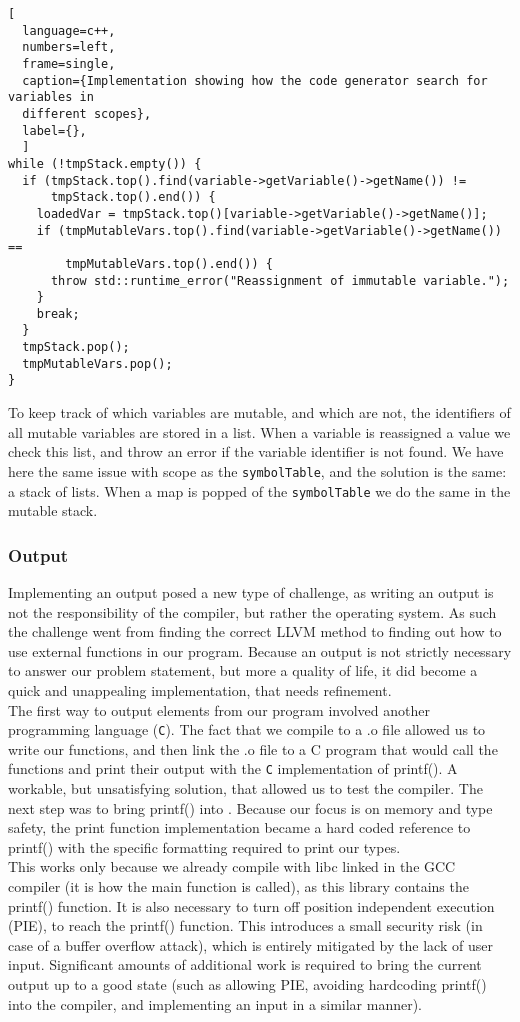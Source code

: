 \begin{lstlisting}[
  language=c++,
  numbers=left, 
  frame=single,
  caption={Implementation showing how the code generator search for variables in
  different scopes},
  label={},
  ]
while (!tmpStack.empty()) {
  if (tmpStack.top().find(variable->getVariable()->getName()) !=
      tmpStack.top().end()) {
    loadedVar = tmpStack.top()[variable->getVariable()->getName()];
    if (tmpMutableVars.top().find(variable->getVariable()->getName()) ==
        tmpMutableVars.top().end()) {
      throw std::runtime_error("Reassignment of immutable variable.");
    }
    break;
  }
  tmpStack.pop();
  tmpMutableVars.pop();
}
\end{lstlisting}

To keep track of which variables are mutable, and which are not, the identifiers of
all mutable variables are stored in a list. When a variable is reassigned a value we
check this list, and throw an error if the variable identifier is not found. We have
here the same issue with scope as the \texttt{symbolTable}, and the solution is the same: a
stack of lists. When a map is popped of the \texttt{symbolTable} we do the same in the
mutable stack.

\subsubsection{Output}
\label{sec:Output}
Implementing an output posed a new type of challenge, as writing an output is not the responsibility of the compiler, but rather the operating system. As such the challenge went from finding the correct LLVM method to finding out how to use external functions in our program. Because an output is not strictly necessary to answer our problem statement, but more a quality of life, it did become a quick and unappealing implementation, that needs refinement.\\

The first way to output elements from our  program involved another programming
language (\texttt{C}). The fact that we compile to a .o file allowed us to write our
functions, and then link the .o file to a C program that would call the \lang{}
functions and print their output with the \texttt{C} implementation of printf(). A workable, but unsatisfying solution, that allowed us to test the compiler. The next step was to bring printf() into \lang. Because our focus is on memory and type safety, the print function implementation became a hard coded reference to printf() with the specific formatting required to print our types.\\

This works only because we already compile with libc linked in the GCC compiler (it
is how the main function is called), as this library contains the printf() function.
It is also necessary to turn off position independent execution (PIE), to reach the
printf() function. This introduces a small security risk (in case of a buffer
overflow attack), which is entirely mitigated by the lack of user input. Significant
amounts of additional work is required to bring the current output up to a good state
(such as allowing PIE, avoiding hardcoding printf() into the compiler, and implementing an input in a similar manner).

